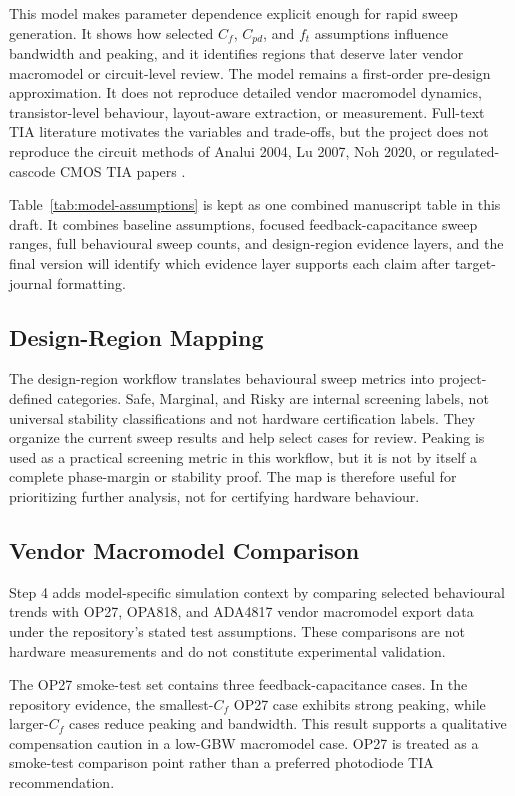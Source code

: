 This model makes parameter dependence explicit enough for rapid sweep generation. It shows how selected $C_f$, $C_{pd}$, and $f_t$ assumptions influence bandwidth and peaking, and it identifies regions that deserve later vendor macromodel or circuit-level review. The model remains a first-order pre-design approximation. It does not reproduce detailed vendor macromodel dynamics, transistor-level behaviour, layout-aware extraction, or measurement. Full-text TIA literature motivates the variables and trade-offs, but the project does not reproduce the circuit methods of Analui 2004, Lu 2007, Noh 2020, or regulated-cascode CMOS TIA papers \citep{ANALUI_2004_BW_ENHANCEMENT,LU_2007_BROADBAND_TIA,NOH_2020_CF_TIA_DC_LOOP,PARK_YOO_2004_RGC_TIA}.

Table~\ref{tab:model-assumptions} is kept as one combined manuscript table in this draft. It combines baseline assumptions, focused feedback-capacitance sweep ranges, full behavioural sweep counts, and design-region evidence layers, and the final version will identify which evidence layer supports each claim after target-journal formatting.

\subsection{Design-Region Mapping}

The design-region workflow translates behavioural sweep metrics into project-defined categories. Safe, Marginal, and Risky are internal screening labels, not universal stability classifications and not hardware certification labels. They organize the current sweep results and help select cases for review. Peaking is used as a practical screening metric in this workflow, but it is not by itself a complete phase-margin or stability proof. The map is therefore useful for prioritizing further analysis, not for certifying hardware behaviour.

\subsection{Vendor Macromodel Comparison}

Step 4 adds model-specific simulation context by comparing selected behavioural trends with OP27, OPA818, and ADA4817 vendor macromodel export data under the repository's stated test assumptions. These comparisons are not hardware measurements and do not constitute experimental validation.

The OP27 smoke-test set contains three feedback-capacitance cases. In the repository evidence, the smallest-$C_f$ OP27 case exhibits strong peaking, while larger-$C_f$ cases reduce peaking and bandwidth. This result supports a qualitative compensation caution in a low-GBW macromodel case. OP27 is treated as a smoke-test comparison point rather than a preferred photodiode TIA recommendation.

